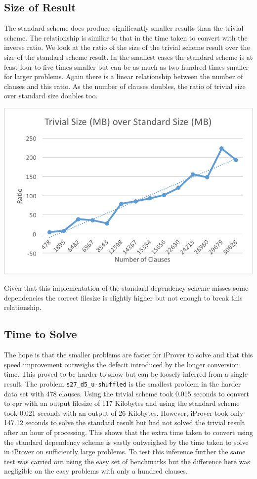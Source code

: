 \subsection{Size of Result}
The standard scheme does produce significantly smaller results than the trivial scheme. The relationship is similar to that in the time taken to convert with the inverse ratio. We look at the ratio of the size of the trivial scheme result over the size of the standard scheme result. In the smallest cases the standard scheme is at least four to five times smaller but can be as much as two hundred times smaller for larger problems. Again there is a linear relationship between the number of clauses and this ratio. As the number of clauses doubles, the ratio of trivial size over standard size doubles too.

\begin{center}
\includegraphics{trivialsizeoverstandardsize.png}
\end{center}

Given that this implementation of the standard dependency scheme misses some dependencies the correct filesize is slightly higher but not enough to break this relationship.

\subsection{Time to Solve} \label{tvsstdsolve}
The hope is that the smaller problems are faster for iProver to solve and that this speed improvement outweighs the defecit introduced by the longer conversion time. This proved to be harder to show but can be loosely inferred from a single result. The problem \texttt{s27\_d5\_u-shuffled} is the smallest problem in the harder data set with 478 clauses. Using the trivial scheme took 0.015 seconds to convert to \gls{epr} with an output filesize of 117 Kilobytes and using the standard scheme took 0.021 seconds with an output of 26 Kilobytes. However, iProver took only 147.12 seconds to solve the standard result but had not solved the trivial result after an hour of processing. This shows that the extra time taken to convert using the standard dependency scheme is vastly outweighed by the time taken to solve in iProver on sufficiently large problems. To test this inference further the same test was carried out using the easy set of benchmarks but the difference here was negligible on the easy problems with only a hundred clauses.

